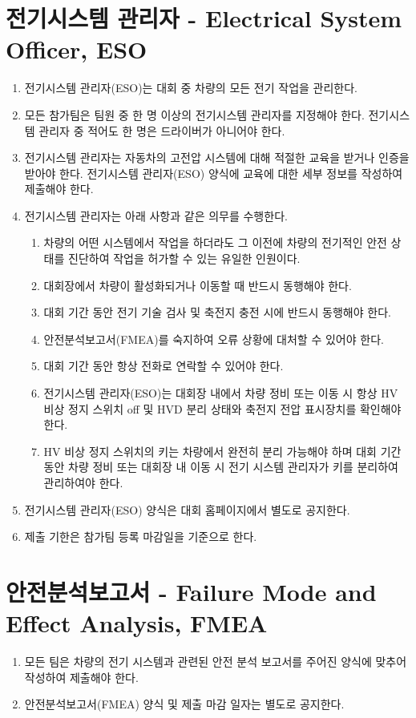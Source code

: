 \documentclass[final,a4paper,10pt]{report}
\begin{document}
\section{전기시스템 관리자 - Electrical System Officer, ESO}
\begin{enumerate}
  \item 전기시스템 관리자(ESO)는 대회 중 차량의 모든 전기 작업을 관리한다.
  \item 모든 참가팀은 팀원 중 한 명 이상의 전기시스템 관리자를 지정해야 한다. 전기시스템 관리자 중 적어도 한 명은 드라이버가 아니어야 한다.
  \item 전기시스템 관리자는 자동차의 고전압 시스템에 대해 적절한 교육을 받거나 인증을 받아야 한다. 전기시스템 관리자(ESO) 양식에 교육에 대한 세부 정보를 작성하여 제출해야 한다.
  
  \item 전기시스템 관리자는 아래 사항과 같은 의무를 수행한다.
    \begin{enumerate}
      \item 차량의 어떤 시스템에서 작업을 하더라도 그 이전에 차량의 전기적인 안전 상태를 진단하여 작업을 허가할 수 있는 유일한 인원이다.
      \item 대회장에서 차량이 활성화되거나 이동할 때 반드시 동행해야 한다.
      \item 대회 기간 동안 전기 기술 검사 및 축전지 충전 시에 반드시 동행해야 한다.
      \item 안전분석보고서(FMEA)를 숙지하여 오류 상황에 대처할 수 있어야 한다.
      \item 대회 기간 동안 항상 전화로 연락할 수 있어야 한다.
      \item 전기시스템 관리자(ESO)는 대회장 내에서 차량 정비 또는 이동 시 항상 HV 비상 정지 스위치 off 및 HVD 분리 상태와 축전지 전압 표시장치를 확인해야 한다.
      \item HV 비상 정지 스위치의 키는 차량에서 완전히 분리 가능해야 하며 대회 기간 동안 차량 정비 또는 대회장 내 이동 시 전기 시스템 관리자가 키를 분리하여 관리하여야 한다.
    \end{enumerate}
    
  \item 전기시스템 관리자(ESO) 양식은 대회 홈페이지에서 별도로 공지한다.
  \item 제출 기한은 참가팀 등록 마감일을 기준으로 한다.
\end{enumerate}

\section{안전분석보고서 - Failure Mode and Effect Analysis, FMEA}
\begin{enumerate}
  \item 모든 팀은 차량의 전기 시스템과 관련된 안전 분석 보고서를 주어진 양식에 맞추어 작성하여 제출해야 한다.
  \item 안전분석보고서(FMEA) 양식 및 제출 마감 일자는 별도로 공지한다.
\end{enumerate}
\end{document}
